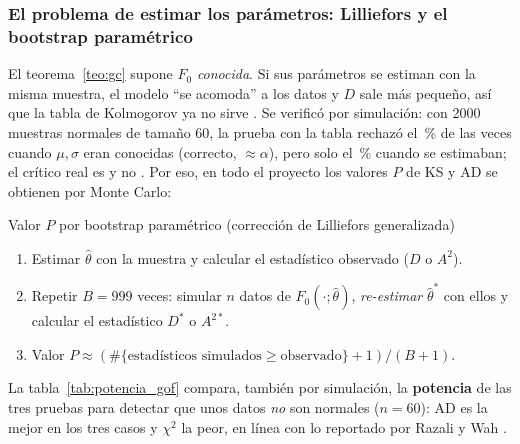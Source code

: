 \documentclass[11pt]{article}
\begin{document}
\subsubsection{El problema de estimar los parámetros: Lilliefors y el bootstrap paramétrico}
El teorema~\ref{teo:gc} supone $F_0$ \emph{conocida}. Si sus parámetros se estiman con la misma muestra, el modelo
``se acomoda'' a los datos y $D$ sale más pequeño, así que la tabla de Kolmogorov ya no sirve \cite{lilliefors}.
Se verificó por simulación: con 2000 muestras normales de tamaño 60, la prueba con la tabla rechazó el
\liConocido\,\% de las veces cuando $\mu,\sigma$ eran conocidas (correcto, $\approx\alpha$), pero solo el
\liClasico\,\% cuando se estimaban; el crítico real es \liDreal{} y no \liDtabla. Por eso, en todo el proyecto los
valores $P$ de KS y AD se obtienen por Monte Carlo:
\begin{algoritmo}{Valor $P$ por bootstrap paramétrico (corrección de Lilliefors generalizada)}
\begin{enumerate}[leftmargin=1.5em]
\item Estimar $\hat\theta$ con la muestra y calcular el estadístico observado ($D$ o $A^2$).
\item Repetir $B=999$ veces: simular $n$ datos de $F_0(\cdot;\hat\theta)$, \emph{re-estimar} $\hat\theta^*$ con
ellos y calcular el estadístico $D^*$ o $A^{2*}$.
\item Valor $P\approx(\#\{\text{estadísticos simulados}\ge\text{observado}\}+1)/(B+1)$.
\end{enumerate}
\end{algoritmo}
La tabla~\ref{tab:potencia_gof} compara, también por simulación, la \textbf{potencia} de las tres pruebas para
detectar que unos datos \emph{no} son normales ($n=60$): AD es la mejor en los tres casos y $\chi^2$ la peor, en
línea con lo reportado por Razali y Wah \cite{razali}.
\end{document}
